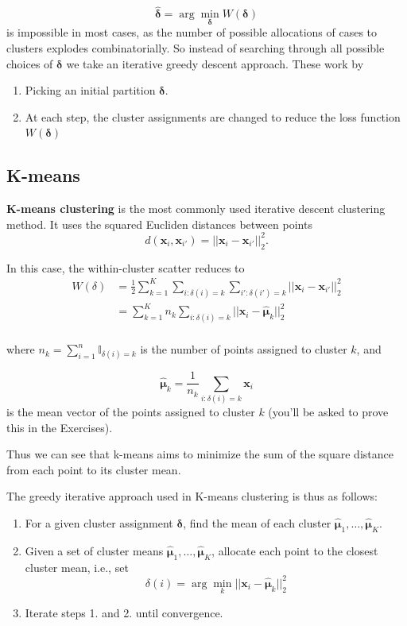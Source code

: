 \documentclass[
]{book}
\providecommand{\tightlist}{%
  \setlength{\itemsep}{0pt}\setlength{\parskip}{0pt}}
\theoremstyle{definition}
\theoremstyle{definition}
\theoremstyle{definition}
\theoremstyle{definition}
\theoremstyle{remark}
\begin{document}
\[\hat{\boldsymbol \delta} = \arg \min_{\boldsymbol \delta} W(\boldsymbol \delta)\]
is impossible in most cases, as the number of possible allocations of cases to clusters explodes combinatorially. So instead of searching through all possible choices of \(\boldsymbol \delta\) we take an iterative greedy descent approach. These work by

\begin{enumerate}
\def\labelenumi{\arabic{enumi}.}
\tightlist
\item
  Picking an initial partition \(\boldsymbol \delta\).
\item
  At each step, the cluster assignments are changed to reduce the loss function \(W(\boldsymbol \delta)\)
\end{enumerate}

\hypertarget{k-means}{%
\subsection{K-means}\label{k-means}}

\textbf{K-means clustering} is the most commonly used iterative descent clustering method. It uses the squared Eucliden distances between points
\[d(\mathbf x_i, \mathbf x_{i'})=||\mathbf x_i - \mathbf x_{i'}||_2^2.\]

In this case, the within-cluster scatter reduces to
\begin{align}
W(\delta) &= \frac{1}{2}\sum_{k=1}^K \sum_{i: \delta(i)=k} \sum_{i': \delta(i')=k} ||\mathbf x_i - \mathbf x_{i'}||_2^2 \\
&= \sum_{k=1}^K n_k \sum_{i: \delta(i)=k} ||\mathbf x_{i} - \hat{{\boldsymbol{\mu}}}_k||_2^2 \label{eq:Wscatterk}\\
\end{align}

where \(n_k = \sum_{i=1}^n \mathbb{I}_{\delta(i)=k}\) is the number of points assigned to cluster \(k\), and

\[\hat{{\boldsymbol{\mu}}}_k=\frac{1}{n_k}\sum_{i: \delta(i)=k} \mathbf x_i\]
is the mean vector of the points assigned to cluster \(k\) (you'll be asked to prove this in the Exercises).

Thus we can see that k-means aims to minimize the sum of the square distance from each point to its cluster mean.

The greedy iterative approach used in K-means clustering is thus as follows:

\begin{enumerate}
\def\labelenumi{\arabic{enumi}.}
\item
  For a given cluster assignment \(\boldsymbol \delta\), find the mean of each cluster \(\hat{{\boldsymbol{\mu}}}_1, \ldots, \hat{{\boldsymbol{\mu}}}_K\).
\item
  Given a set of cluster means \(\hat{{\boldsymbol{\mu}}}_1, \ldots, \hat{{\boldsymbol{\mu}}}_K\), allocate each point to the closest cluster mean, i.e., set
  \[\delta(i) = \arg \min_k ||\mathbf x_i - \hat{{\boldsymbol{\mu}}}_k||_2^2\]
\item
  Iterate steps 1. and 2. until convergence.
\end{enumerate}
\end{document}
